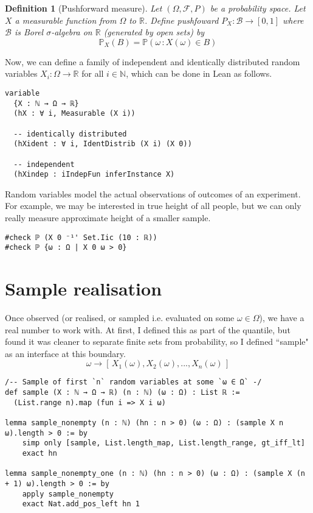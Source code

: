 \documentclass[a4paper, 12pt]{article}
\newtheorem{definition}{Definition}
\newcommand{\R}{\mathbb{R}}
\renewcommand{\P}{\mathbb{P}}
\begin{document}
\begin{definition}[Pushforward measure]
Let $(\Omega, \mathcal{F}, P)$ be a probability space.
Let $X$ a measurable function from $\Omega$ to $\R$.
Define pushfoward $P_X \colon \mathcal{B} \rightarrow [0,1]$
where $\mathcal{B}$ is Borel $\sigma$-algebra on $\R$ (generated by open sets)
by $$\P_X(B)=\P(\omega\,\colon X(\omega)\in B)$$
\end{definition}

Now, we can define a family of independent and identically distributed random variables
$X_i \colon \Omega \to \mathbb{R}$ for all $i\in\mathbb{N}$, which can be done in Lean as follows.

\begin{lstlisting}
variable
  {X : ℕ → Ω → ℝ}
  (hX : ∀ i, Measurable (X i))

  -- identically distributed
  (hXident : ∀ i, IdentDistrib (X i) (X 0))

  -- independent
  (hXindep : iIndepFun inferInstance X)
\end{lstlisting}

Random variables model the actual observations of outcomes of an experiment.
For example, we may be interested in true height of all people,
but we can only really measure approximate height of a smaller sample.

\begin{lstlisting}
#check ℙ (X 0 ⁻¹' Set.Iic (10 : ℝ))
#check ℙ {ω : Ω | X 0 ω > 0}
\end{lstlisting}


\section*{Sample realisation}

Once observed (or realised, or sampled i.e. evaluated on some $\omega\in\Omega$),
we have a real number to work with.
At first, I defined this as part of the quantile,
but found it was cleaner to separate finite sets from probability,
so I defined ``sample" as an interface at this boundary.
$$\omega \to [\,X_1(\omega), X_2(\omega), ..., X_n(\omega)\,]$$


\begin{lstlisting}
/-- Sample of first `n` random variables at some `ω ∈ Ω` -/
def sample (X : ℕ → Ω → ℝ) (n : ℕ) (ω : Ω) : List ℝ :=
  (List.range n).map (fun i => X i ω)

lemma sample_nonempty (n : ℕ) (hn : n > 0) (ω : Ω) : (sample X n ω).length > 0 := by
    simp only [sample, List.length_map, List.length_range, gt_iff_lt]
    exact hn

lemma sample_nonempty_one (n : ℕ) (hn : n > 0) (ω : Ω) : (sample X (n + 1) ω).length > 0 := by
    apply sample_nonempty
    exact Nat.add_pos_left hn 1
\end{lstlisting}
\end{document}
